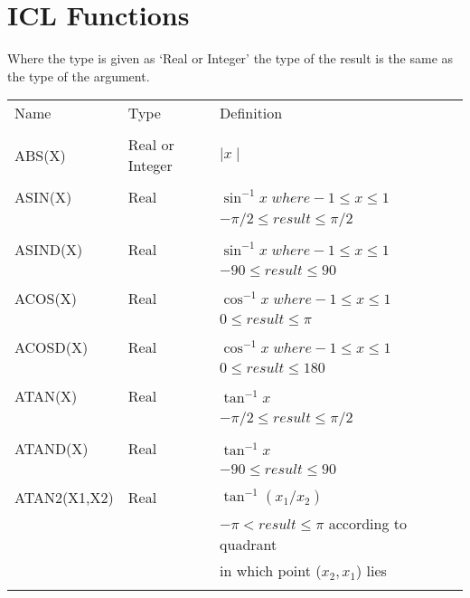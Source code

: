 \documentclass[twoside,11pt]{report}
\newcommand{\xlabel}[1]{}
\begin{document}
\appendix
\chapter{\xlabel{icl_functions}ICL Functions}

Where the type is given as `Real or Integer' the type of the result is the
same as the type of the argument.
\begin{center}
\begin{tabular}{llll}

Name & Type & Definition \\
\\
ABS(X) & Real or Integer & $\mid x \mid$\\
\\
ASIN(X) & Real & $\sin^{-1} x \; where -1 \leq x \leq 1 $\\
   &  &  $ -\pi/2 \leq result \leq \pi/2$\\
\\
ASIND(X) & Real & $\sin^{-1} x \; where -1 \leq x \leq 1 $\\
   &  &  $ -90 \leq result \leq 90$\\
\\
ACOS(X) & Real & $\cos^{-1} x \; where -1 \leq x \leq 1 $\\
   &  &  $ 0 \leq result \leq \pi$\\
\\
ACOSD(X) & Real & $\cos^{-1} x \; where -1 \leq x \leq 1 $\\
   &  &  $ 0 \leq result \leq 180$\\
\\
ATAN(X) & Real & $\tan^{-1} x $ \\
   &  &  $ -\pi/2 \leq result \leq \pi/2$\\
\\
ATAND(X) & Real & $\tan^{-1} x $ \\
   &  &  $ -90 \leq result \leq 90$\\
\\
ATAN2(X1,X2) & Real & $\tan^{-1} (x_{1}/x_{2}) $\\
   & & $ -\pi < result \leq \pi $ according to quadrant \\
   & & in which point ($x_{2},x_{1}$) lies\\
\\
\end{tabular}
\end{center}
\newpage
\end{document}

